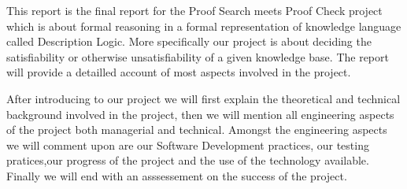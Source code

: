 This report is the final report for the Proof Search meets Proof Check
project which is about formal reasoning in a formal representation
of knowledge language called Description Logic. More specifically our 
project is about deciding the satisfiability or otherwise unsatisfiability
of a given knowledge base. The report will provide a detailled account of
most aspects involved in the project.

After introducing to our project we will first explain the theoretical
and technical background involved in the project, then we will mention
all engineering aspects of the project both managerial and
technical. Amongst the engineering aspects we will comment upon are
our Software Development practices, our testing pratices,our progress
of the project and the use of the technology available. Finally we
will end with an asssessement on the success of the project.
